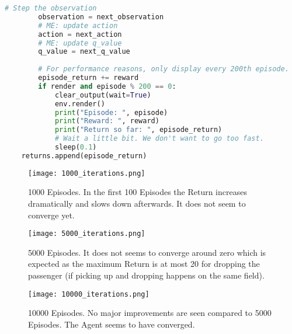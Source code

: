 \documentclass[a4paper, 11pt]{article}
\begin{document}
\begin{lstlisting}[language=Python]
        # Step the observation
        observation = next_observation
        # ME: update action
        action = next_action
        # ME: update q_value
        q_value = next_q_value
                
        # For performance reasons, only display every 200th episode.
        episode_return += reward
        if render and episode % 200 == 0:
            clear_output(wait=True)
            env.render()
            print("Episode: ", episode)
            print("Reward: ", reward)
            print("Return so far: ", episode_return)
            # Wait a little bit. We don't want to go too fast.
            sleep(0.1)
    returns.append(episode_return)
\end{lstlisting}
\begin{figure}
\texttt{[image: 1000\_iterations.png]}
\caption{1000 Episodes. In the first 100 Episodes the Return increases dramatically and slows down afterwards. It does not seem to converge yet.}
\end{figure}
\begin{figure}
\texttt{[image: 5000\_iterations.png]}
\caption{5000 Episodes. It does not seems to converge around zero which is expected as the maximum Return is at most 20 for dropping the passenger (if picking up and dropping happens on the same field).}
\end{figure}
\begin{figure}
\texttt{[image: 10000\_iterations.png]}
\caption{10000 Episodes. No major improvements are seen compared to 5000 Episodes. The Agent seems to have converged.}
\end{figure}
\end{document}
